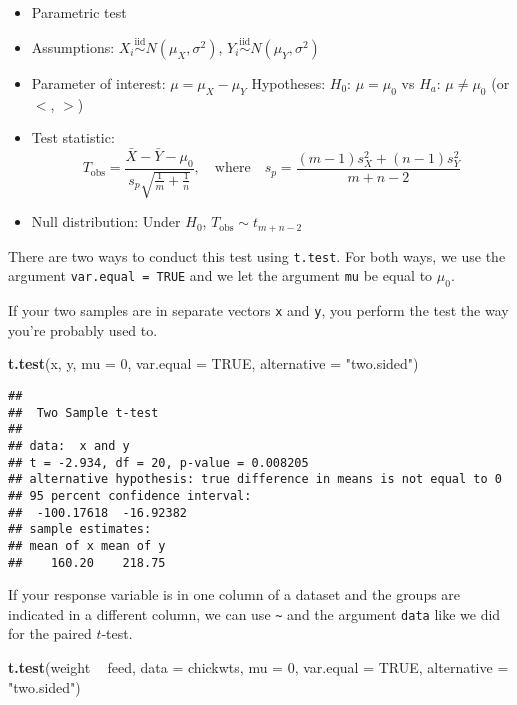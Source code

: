 \documentclass[
]{book}
\newenvironment{Shaded}{\begin{snugshade}}{\end{snugshade}}
\newcommand{\DataTypeTok}[1]{\textcolor[rgb]{0.13,0.29,0.53}{#1}}
\newcommand{\DecValTok}[1]{\textcolor[rgb]{0.00,0.00,0.81}{#1}}
\newcommand{\KeywordTok}[1]{\textcolor[rgb]{0.13,0.29,0.53}{\textbf{#1}}}
\newcommand{\NormalTok}[1]{#1}
\newcommand{\OperatorTok}[1]{\textcolor[rgb]{0.81,0.36,0.00}{\textbf{#1}}}
\newcommand{\OtherTok}[1]{\textcolor[rgb]{0.56,0.35,0.01}{#1}}
\newcommand{\StringTok}[1]{\textcolor[rgb]{0.31,0.60,0.02}{#1}}
\providecommand{\tightlist}{%
  \setlength{\itemsep}{0pt}\setlength{\parskip}{0pt}}
\begin{document}
\begin{itemize}
\tightlist
\item
  Parametric test
\item
  Assumptions: \(X_i \overset{\mathrm{iid}} \sim N(\mu_X, \sigma^2)\),
  \(Y_i \overset{\mathrm{iid}} \sim N(\mu_Y, \sigma^2)\)
\item
  Parameter of interest: \(\mu = \mu_X - \mu_Y\)
  Hypotheses: \(H_0\): \(\mu = \mu_0\) vs \(H_a\): \(\mu \neq \mu_0\) (or \(<\), \(>\))
\item
  Test statistic:
  \[T_{\mathrm{obs}} = \frac{\bar{X} - \bar{Y} - \mu_0}{s_p \sqrt{\frac{1}{m} + \frac{1}{n}}},
  \quad \text{where} \quad s_p = \frac{(m-1)s_X^2 + (n-1)s_Y^2}{m + n - 2}\]
\item
  Null distribution: Under \(H_0\), \(T_{\mathrm{obs}} \sim t_{m + n - 2}\)
\end{itemize}

There are two ways to conduct this test using \texttt{t.test}.
For both ways, we use the argument \texttt{var.equal\ =\ TRUE}
and we let the argument \texttt{mu} be equal to \(\mu_0\).

If your two samples are in separate vectors \texttt{x} and \texttt{y},
you perform the test the way you're probably used to.

\begin{Shaded}
\begin{Highlighting}[]
\KeywordTok{t.test}\NormalTok{(x, y, }\DataTypeTok{mu =} \DecValTok{0}\NormalTok{, }\DataTypeTok{var.equal =} \OtherTok{TRUE}\NormalTok{, }\DataTypeTok{alternative =} \StringTok{"two.sided"}\NormalTok{)}
\end{Highlighting}
\end{Shaded}

\begin{verbatim}
## 
##  Two Sample t-test
## 
## data:  x and y
## t = -2.934, df = 20, p-value = 0.008205
## alternative hypothesis: true difference in means is not equal to 0
## 95 percent confidence interval:
##  -100.17618  -16.92382
## sample estimates:
## mean of x mean of y 
##    160.20    218.75
\end{verbatim}

If your response variable is in one column of a dataset and the
groups are indicated in a different column,
we can use \texttt{\textasciitilde{}} and the argument \texttt{data} like we did for the paired \(t\)-test.

\begin{Shaded}
\begin{Highlighting}[]
\KeywordTok{t.test}\NormalTok{(weight }\OperatorTok{~}\StringTok{ }\NormalTok{feed, }\DataTypeTok{data =}\NormalTok{ chickwts,}
       \DataTypeTok{mu =} \DecValTok{0}\NormalTok{, }\DataTypeTok{var.equal =} \OtherTok{TRUE}\NormalTok{, }\DataTypeTok{alternative =} \StringTok{"two.sided"}\NormalTok{)}
\end{Highlighting}
\end{Shaded}
\end{document}
